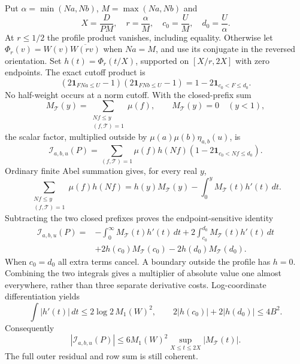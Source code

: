 Put $\alpha=\min(Na,Nb)$, $M=\max(Na,Nb)$ and
\[
 X=\frac D{PM},\quad r=\frac\alpha M,\quad
 c_0=\frac U M,\quad d_0=\frac U\alpha.
\]
At $r\le1/2$ the profile product vanishes, including equality.
Otherwise let $\Phi_r(v)=W(v)\overline{W(rv)}$ when $Na=M$,
and use its conjugate in the reversed orientation. Set
$h(t)=\Phi_r(t/X)$, supported on $[X/r,2X]$ with zero endpoints.
The exact cutoff product is
\[
 (2\mathbf1_{FNa\le U}-1)(2\mathbf1_{FNb\le U}-1)
       =1-2\mathbf1_{c_0<F\le d_0}.
\]
No half-weight occurs at a norm cutoff. With the closed-prefix sum
\[
 M_{\mathcal T}(y)=\sum_{\substack{Nf\le y\\(f,\mathcal T)=1}}\mu(f),
 \qquad M_{\mathcal T}(y)=0\quad(y<1),
\]
the scalar factor, multiplied outside by
$\mu(a)\mu(b)\eta_{a,b}(u)$, is
\begin{equation}\label{cmr:scalar-kernel}
 \mathcal I_{a,b,u}(P)=
 \sum_{(f,\mathcal T)=1}\mu(f)h(Nf)
                   (1-2\mathbf1_{c_0<Nf\le d_0}).
\end{equation}
Ordinary finite Abel summation gives, for every real $y$,
\[
 \sum_{\substack{Nf\le y\\(f,\mathcal T)=1}}\mu(f)h(Nf)
   =h(y)M_{\mathcal T}(y)-\int_0^y M_{\mathcal T}(t)h'(t)\,dt.
\]
Subtracting the two closed prefixes proves the endpoint-sensitive identity
\begin{equation}\label{cmr:two-jump}
 \begin{split}
 \mathcal I_{a,b,u}(P)={}&-\int_0^\infty M_{\mathcal T}(t)h'(t)\,dt
              +2\int_{c_0}^{d_0}M_{\mathcal T}(t)h'(t)\,dt\\
       &+2h(c_0)M_{\mathcal T}(c_0)
                   -2h(d_0)M_{\mathcal T}(d_0).
 \end{split}
\end{equation}
When $c_0=d_0$ all extra terms cancel. A boundary outside the profile
has $h=0$. Combining the two integrals gives a multiplier of absolute
value one almost everywhere, rather than three separate derivative
costs. Log-coordinate differentiation yields
\[
 \int|h'(t)|\,dt\le2\log2\,M_1(W)^2,
 \qquad 2|h(c_0)|+2|h(d_0)|\le4B^2.
\]
Consequently
\begin{equation}\label{cmr:abel-variation}
 |\mathcal I_{a,b,u}(P)|
 \le6M_1(W)^2\sup_{X\le t\le2X}|M_{\mathcal T}(t)|.
\end{equation}
The full outer residual and row sum is still coherent.

